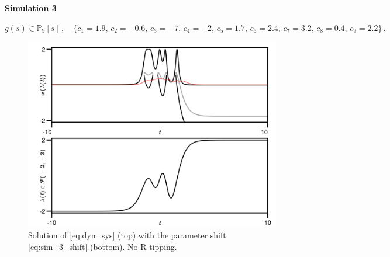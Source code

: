 \documentclass[../main.tex]{subfiles}
\begin{document}
\paragraph{Simulation 3}\label{par:sim_3}

\begin{equation}\label{eq:sim_3_shift}
        g(s) \in \mathbb{P}_{9}[s]\,,\quad\{c_{1}=1.9,\, c_{2}=-0.6,\, c_{3}=-7,\, c_{4}=-2,\, c_{5}=1.7,\, c_{6}=2.4,\, c_{7}=3.2,\, c_{8}=0.4,\, c_{9}=2.2\}\,.
\end{equation}

\begin{figure}[H]
    \centering 
    \includegraphics[keepaspectratio, width=\textwidth]{../figures/sim_3.png}
    \caption{Solution of \eqref{eq:dyn_sys} (top) with the parameter shift \eqref{eq:sim_3_shift} (bottom). No R-tipping.}
    \label{fig:sim_3}
\end{figure}
\end{document}

